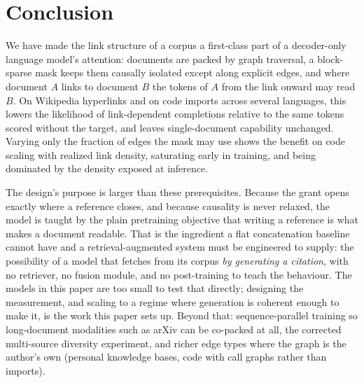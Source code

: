 \section{Conclusion}
\label{sec:conclusion}

We have made the link structure of a corpus a first-class part of a decoder-only
language model's attention: documents are packed by graph traversal, a block-sparse
mask keeps them causally isolated except along explicit edges, and where document $A$
links to document $B$ the tokens of $A$ from the link onward may read $B$. On
Wikipedia hyperlinks and on code imports across several languages, this lowers the
likelihood of link-dependent completions relative to the same tokens scored without
the target, and leaves single-document capability unchanged. Varying only the fraction
of edges the mask may use shows the benefit on code scaling with realized link
density, saturating early in training, and being dominated by the density exposed at
inference.

The design's purpose is larger than these prerequisites. Because the grant opens
exactly where a reference closes, and because causality is never relaxed, the model is
taught by the plain pretraining objective that writing a reference is what makes a
document readable. That is the ingredient a flat concatenation baseline cannot have
and a retrieval-augmented system must be engineered to supply: the possibility of a
model that fetches from its corpus \emph{by generating a citation}, with no retriever,
no fusion module, and no post-training to teach the behaviour. The models in this
paper are too small to test that directly; designing the measurement, and scaling to
a regime where generation is coherent enough to make it, is the work this paper sets
up. Beyond that: sequence-parallel training so long-document modalities such as arXiv
can be co-packed at all, the corrected multi-source diversity experiment, and richer
edge types where the graph is the author's own (personal knowledge bases, code with
call graphs rather than imports).
